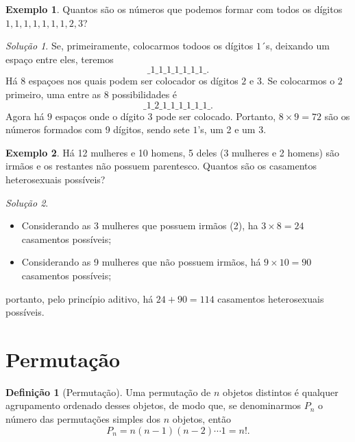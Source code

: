 \documentclass[]{book}
\providecommand{\tightlist}{%
  \setlength{\itemsep}{0pt}\setlength{\parskip}{0pt}}
\theoremstyle{definition}
\newtheorem{definition}{Definição}[chapter]
\theoremstyle{definition}
\newtheorem{example}{Exemplo}[chapter]
\theoremstyle{definition}
\theoremstyle{remark}
\newtheorem*{solution}{Solução}
\begin{document}
\begin{example}
\protect\hypertarget{exm:unnamed-chunk-46}{}{\label{exm:unnamed-chunk-46} }Quantos são os números que podemos formar com todos os dígitos \(1, 1, 1, 1, 1, 1, 1, 2, 3\)?
\end{example}

\begin{solution}
\iffalse{} {Solução. } \fi{}Se, primeiramente, colocarmos todoos os dígitos \(1\)´s, deixando um espaço entre eles, teremos
\[\_1\_1\_1\_1\_1\_1\_1\_.\]
Há \(8\) espaçoes nos quais podem ser colocador os dígitos \(2\) e \(3\).
Se colocarmos o \(2\) primeiro, uma entre as 8 possibilidades é
\[\_1\_2\_1\_1\_1\_1\_1\_1\_.\]
Agora há \(9\) espaços onde o dígito \(3\) pode ser colocado.
Portanto, \(8 \times 9 = 72\) são os números formados com 9 dígitos, sendo sete \(1\)'s, um 2 e um 3.
\end{solution}

\begin{example}
\protect\hypertarget{exm:unnamed-chunk-48}{}{\label{exm:unnamed-chunk-48} }Há 12 mulheres e 10 homens, 5 deles (3 mulheres e 2 homens) são irmãos e os restantes não possuem parentesco.
Quantos são os casamentos heterosexuais possíveis?
\end{example}

\begin{solution}
\iffalse{} {Solução. } \fi{}

\begin{itemize}
\tightlist
\item
  Considerando as 3 mulheres que possuem irmãos (2), ha \(3\times 8=24\) casamentos possíveis;
\item
  Considerando as 9 mulheres que não possuem irmãos, há \(9\times 10=90\) casamentos possíveis;
\end{itemize}

portanto, pelo princípio aditivo, há \(24+90 = 114\) casamentos heterosexuais possíveis.
\end{solution}

\hypertarget{permutauxe7uxe3o}{%
\section{Permutação}\label{permutauxe7uxe3o}}

\begin{definition}[Permutação]
\protect\hypertarget{def:defPermutacao}{}{\label{def:defPermutacao} \iffalse (Permutação) \fi{} }Uma permutação de \(n\) objetos distintos é qualquer agrupamento ordenado desses objetos, de modo que, se denominarmos \(P_n\) o número das permutações simples dos \(n\) objetos, então
\[P_n = n(n-1)(n-2)\cdots 1 = n!.\]
\end{definition}
\end{document}
